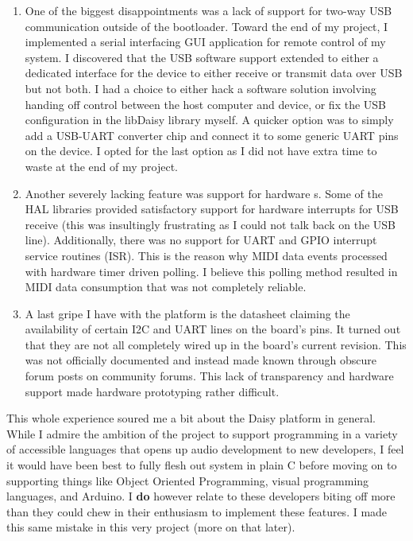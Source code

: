 \documentclass[acmlarge,screen]{acmart}
\begin{document}
	\begin{enumerate}
	\item One of the biggest disappointments was a lack of support for two-way USB communication outside of the bootloader. Toward the end of my project, I implemented a serial interfacing GUI application for remote control of my system. I discovered that the USB software support extended to either a dedicated interface for the device to either receive or transmit data over USB but not both. I had a choice to either hack a software solution involving handing off control between the host computer and device, or fix the USB configuration in the libDaisy library myself. A quicker option was to simply add a USB-UART converter chip and connect it to some generic UART pins on the device. I opted for the last option as I did not have extra time to waste at the end of my project.
	\item Another severely lacking feature was support for hardware s. Some of the HAL libraries provided satisfactory support for hardware interrupts for USB receive (this was insultingly frustrating as I could not talk back on the USB line). Additionally, there was no support for UART and GPIO interrupt service routines (ISR). This is the reason why MIDI data events processed with hardware timer driven polling. I believe this polling method resulted in MIDI data consumption that was not completely reliable.
	\item A last gripe I have with the platform is the datasheet claiming the availability of certain I2C and UART lines on the board's pins. It turned out that they are not all completely wired up in the board's current revision. This was not officially documented and instead made known through obscure forum posts on community forums. This lack of transparency and hardware support made hardware prototyping rather difficult.
	\end{enumerate}

	This whole experience soured me a bit about the Daisy platform in general. While I admire the ambition of the project to support programming in a variety of accessible languages that opens up audio development to new developers, I feel it would have been best to fully flesh out system in plain C before moving on to supporting things like Object Oriented Programming, visual programming languages, and Arduino. I \textbf{do} however relate to these developers biting off more than they could chew in their enthusiasm to implement these features. I made this same mistake in this very project (more on that later).
\end{document}
